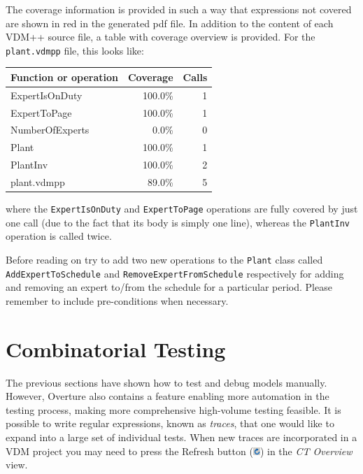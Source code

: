 The coverage information is provided in such a way that expressions not covered are shown in red in the generated pdf file. In addition to the content of each VDM++ source file, a table with coverage overview is provided. For the \texttt{plant.vdmpp}
file, this looks like: 

\begin{longtable}{|l|r|r|}
\hline
Function or operation & Coverage & Calls \\
\hline
\hline
ExpertIsOnDuty & 100.0\% & 1 \\
\hline
ExpertToPage & 100.0\% & 1 \\
\hline
NumberOfExperts & 0.0\% & 0 \\
\hline
Plant & 100.0\% & 1 \\
\hline
PlantInv & 100.0\% & 2 \\
\hline
\hline
plant.vdmpp & 89.0\% & 5 \\
\hline
\end{longtable}

\noindent where the \texttt{ExpertIsOnDuty} and \texttt{ExpertToPage} operations are fully covered by just one call (due to the fact that its body is simply one line), whereas the \texttt{PlantInv} operation is called twice.

\begin{myhardexercise}\label{ex:addingfunctionality}
Before reading on try to add two new operations to the \texttt{Plant} class called \texttt{AddExpertToSchedule} and \texttt{RemoveExpertFromSchedule} respectively for adding and removing an expert to/from the schedule for a particular period. Please remember to include pre-conditions when necessary.
\end{myhardexercise}

\newpage

\section{Combinatorial Testing}\label{sec:CT}
The previous sections have shown how to test and debug models manually. However, Overture also contains a feature enabling more automation in the testing process, making more comprehensive high-volume testing feasible. It is possible to write regular expressions, known as \emph{traces}, that one would like to expand into a large set of individual tests. When new traces are incorporated in a VDM project you may need to press the \textsf{Refresh} button
(\includegraphics[width=0.02\textwidth]{figures/refresh}) in the \emph{CT Overview} view.

